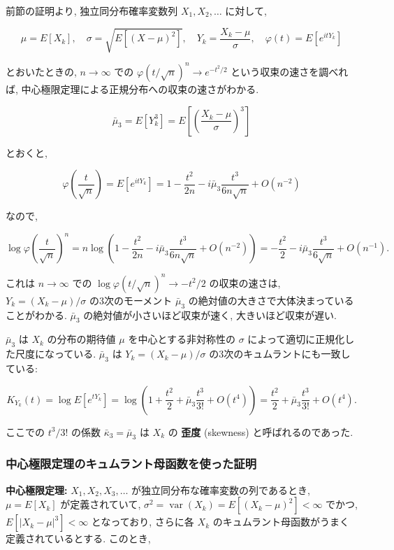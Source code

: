 \documentclass[
  letterpaper,
  DIV=11,
  numbers=noendperiod]{scrartcl}
\begin{document}
前節の証明より, 独立同分布確率変数列 \(X_1,X_2,\ldots\) に対して,

\[
\mu = E[X_k], \quad
\sigma = \sqrt{E[(X-\mu)^2]}, \quad
Y_k = \frac{X_k - \mu}{\sigma}, \quad
\varphi(t) = E[e^{itY_k}]
\]

とおいたときの, \(n\to\infty\) での
\(\varphi(t/\sqrt{n})^n \to e^{-t^2/2}\) という収束の速さを調べれば,
中心極限定理による正規分布への収束の速さがわかる.

\[
\bar\mu_3 = E[Y_k^3] = E\left[\left(\frac{X_k - \mu}{\sigma}\right)^3\right]
\]

とおくと,

\[
\varphi\left(\frac{t}{\sqrt{n}}\right) = E[e^{itY_k}] =
1 - \frac{t^2}{2n} - i\bar\mu_3\frac{t^3}{6n\sqrt{n}} + O(n^{-2})
\]

なので,

\[
\log\varphi\left(\frac{t}{\sqrt{n}}\right)^n = 
n\log\left(1 - \frac{t^2}{2n} - i\bar\mu_3\frac{t^3}{6n\sqrt{n}} + O(n^{-2})\right) =
-\frac{t^2}{2} - i\bar\mu_3\frac{t^3}{6\sqrt{n}} + O(n^{-1}).
\]

これは \(n\to\infty\) での
\(\log\varphi\left(t/\sqrt{n}\right)^n \to -t^2/2\) の収束の速さは,
\(Y_k=(X_k-\mu)/\sigma\) の3次のモーメント \(\bar\mu_3\)
の絶対値の大きさで大体決まっていることがわかる. \(\bar\mu_3\)
の絶対値が小さいほど収束が速く, 大きいほど収束が遅い.

\(\bar\mu_3\) は \(X_k\) の分布の期待値 \(\mu\) を中心とする非対称性の
\(\sigma\) によって適切に正規化した尺度になっている. \(\bar\mu_3\) は
\(Y_k=(X_k-\mu)/\sigma\) の3次のキュムラントにも一致している:

\[
K_{Y_k}(t) = \log E[e^{tY_k}] =
\log\left(1 + \frac{t^2}{2} + \bar\mu_3\frac{t^3}{3!} + O(t^4)\right) =
\frac{t^2}{2} + \bar\mu_3 \frac{t^3}{3!} + O(t^4).
\]

ここでの \(t^3/3!\) の係数 \(\bar\kappa_3 = \bar\mu_3\) は \(X_k\) の
\textbf{歪度} (skewness) と呼ばれるのであった.

\hypertarget{ux4e2dux5fc3ux6975ux9650ux5b9aux7406ux306eux30adux30e5ux30e0ux30e9ux30f3ux30c8ux6bcdux51fdux6570ux3092ux4f7fux3063ux305fux8a3cux660e}{%
\subsubsection{中心極限定理のキュムラント母函数を使った証明}\label{ux4e2dux5fc3ux6975ux9650ux5b9aux7406ux306eux30adux30e5ux30e0ux30e9ux30f3ux30c8ux6bcdux51fdux6570ux3092ux4f7fux3063ux305fux8a3cux660e}}

\textbf{中心極限定理:} \(X_1, X_2, X_3, \ldots\)
が独立同分布な確率変数の列であるとき, \(\mu=E[X_k]\) が定義されていて,
\(\sigma^2 = \operatorname{var}(X_k) = E[(X_k - \mu)^2] < \infty\)
でかつ, \(E[|X_k - \mu|^3] < \infty\) となっており, さらに各 \(X_k\)
のキュムラント母函数がうまく定義されているとする. このとき,
\end{document}

